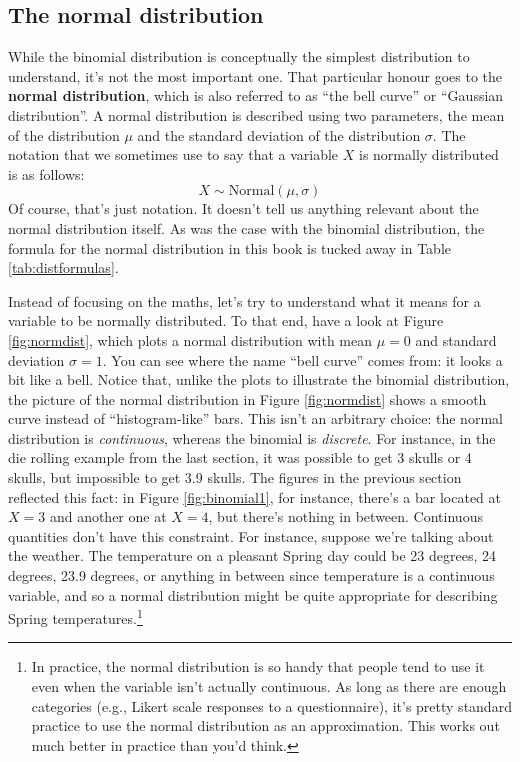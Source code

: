 \documentclass[
]{book}
\theoremstyle{definition}
\theoremstyle{definition}
\theoremstyle{definition}
\theoremstyle{definition}
\theoremstyle{remark}
\begin{document}
\hypertarget{normal}{%
\subsection{The normal distribution}\label{normal}}

While the binomial distribution is conceptually the simplest distribution to understand, it's not the most important one. That particular honour goes to the \textbf{normal distribution}, which is also referred to as ``the bell curve'' or ``Gaussian distribution''. A normal distribution is described using two parameters, the mean of the distribution \(\mu\) and the standard deviation of the distribution \(\sigma\). The notation that we sometimes use to say that a variable \(X\) is normally distributed is as follows:
\[
X \sim \mbox{Normal}(\mu,\sigma)
\]
Of course, that's just notation. It doesn't tell us anything relevant about the normal distribution itself. As was the case with the binomial distribution, the formula for the normal distribution in this book is tucked away in Table \ref{tab:distformulas}.

Instead of focusing on the maths, let's try to understand what it means for a variable to be normally distributed. To that end, have a look at Figure \ref{fig:normdist}, which plots a normal distribution with mean \(\mu = 0\) and standard deviation \(\sigma = 1\). You can see where the name ``bell curve'' comes from: it looks a bit like a bell. Notice that, unlike the plots to illustrate the binomial distribution, the picture of the normal distribution in Figure \ref{fig:normdist} shows a smooth curve instead of ``histogram-like'' bars. This isn't an arbitrary choice: the normal distribution is \emph{continuous}, whereas the binomial is \emph{discrete}. For instance, in the die rolling example from the last section, it was possible to get 3 skulls or 4 skulls, but impossible to get 3.9 skulls. The figures in the previous section reflected this fact: in Figure \ref{fig:binomial1}, for instance, there's a bar located at \(X=3\) and another one at \(X=4\), but there's nothing in between. Continuous quantities don't have this constraint. For instance, suppose we're talking about the weather. The temperature on a pleasant Spring day could be 23 degrees, 24 degrees, 23.9 degrees, or anything in between since temperature is a continuous variable, and so a normal distribution might be quite appropriate for describing Spring temperatures.\footnote{In practice, the normal distribution is so handy that people tend to use it even when the variable isn't actually continuous. As long as there are enough categories (e.g., Likert scale responses to a questionnaire), it's pretty standard practice to use the normal distribution as an approximation. This works out much better in practice than you'd think.}
\end{document}
